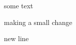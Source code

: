 \documentclass[a4, 12pt]{article}
\date{\today}
\begin{document}
some text
\newpage

making a small change \newline


new line
\end{document}
